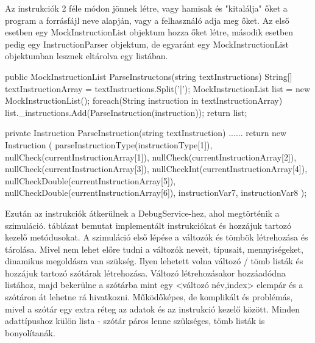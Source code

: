 Az instrukciók 2 féle módon jönnek létre, vagy hamisak és "kitalálja" őket a program a forrásfájl neve alapján, vagy a felhasználó adja meg őket. Az első esetben egy MockInstructionList objektum hozza őket létre, második esetben pedig egy InstructionParser objektum, de egyaránt egy MockInstructionList objektumban lesznek eltárolva egy listában.

\begin{cpp}
public MockInstructionList ParseInstructons(string textInstructions)
        {
            String[] textInstructionArray = textInstructions.Split('|');
            MockInstructionList list = new MockInstructionList();
            foreach(String instruction in textInstructionArray)
            {         
                list._instructions.Add(ParseInstruction(instruction));
            }
            return list;
        }
        
private Instruction ParseInstruction(string textInstruction)
        {
            ......
            return  new Instruction
                (
                    parseInstructionType(instructionType[1]),
                    nullCheck(currentInstructionArray[1]),
                    nullCheck(currentInstructionArray[2]),
                    nullCheck(currentInstructionArray[3]), 
                    nullCheckInt(currentInstructionArray[4]),
                    nullCheckDouble(currentInstructionArray[5]),
                    nullCheckDouble(currentInstructionArray[6]),
                    instructionVar7,
                    instructionVar8
                 );
        }
\end{cpp}


Ezután az instrukciók átkerülnek a DebugService-hez, ahol megtörténik a szimuláció.  táblázat bemutat implementált instrukciókat és hozzájuk tartozó kezelő metódusokat. A szimuláció első lépése a változók és tömbök létrehozása és tárolása. Mivel nem lehet előre tudni a változók neveit, típusait, mennyiségeket, dinamikus megoldásra van szükség. Ilyen lehetett volna változó / tömb listák és hozzájuk tartozó szótárak létrehozása. Változó létrehozásakor hozzáadódna listához, majd bekerülne a szótárba mint egy <változó név,index> elempár és a szótáron át lehetne rá hivatkozni. Működőképes, de komplikált és problémás, mivel a szótár egy extra réteg az adatok és az instrukció kezelő között. Minden adattípushoz külön lista - szótár páros lenne szükséges, tömb listák is bonyolítanák.

